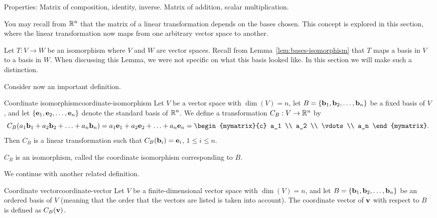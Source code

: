 Properties: Matrix of composition, identity, inverse. Matrix of
addition, scalar multiplication.



You may recall from $\mathbb{R}^n$ that the matrix of a linear transformation
depends on the bases chosen. This concept is explored in this section,
where the linear transformation now maps from one arbitrary vector
space to another.

Let $T: V \to W$ be an isomorphism where $V$ and $W$ are vector
spaces. Recall from Lemma~\ref{lem:bases-isomorphism} that $T$ maps a
basis in $V$ to a basis in $W$. When discussing this Lemma, we were
not specific on what this basis looked like. In this section we will
make such a distinction.

Consider now an important definition.

\begin{definition}{Coordinate isomorphism}{coordinate-isomorphism}
  Let $V$ be a vector space with $\dim(V)=n$, let
  $B=\left\{\mbox{\bf b}_1, \mbox{\bf b}_2, \ldots, \mbox{\bf b}_n\right\}$ be a fixed
  basis of $V$, and let
  $\left\{\mbox{\bf e}_1, \mbox{\bf e}_2, \ldots, \mbox{\bf e}_n\right\}$ denote the
  standard basis of $\mathbb{R}^n$.  We define a transformation $C_B:V\to\mathbb{R}^n$
  by
  \begin{equation*}
    C_B(a_1\vect{b}_1 + a_2\vect{b}_2 + \ldots + a_n\vect{b}_n)
    =
    a_1\vect{e}_1 + a_2\vect{e}_2 + \ldots + a_n\vect{e}_n
    =
    \begin{mymatrix}{c} a_1 \\ a_2 \\ \vdots \\ a_n
    \end{mymatrix}.
  \end{equation*}
  Then $C_B$ is a linear transformation
  such that
  $C_B(\mbox{\bf b}_i)=\mbox{\bf e}_i$, $1\leq i\leq n$.

  $C_B$ is an isomorphism, called
  the coordinate isomorphism corresponding to $B$.
\end{definition}

We continue with another related definition.

\begin{definition}{Coordinate vector}{coordinate-vector}
  Let $V$ be a finite-dimensional vector space with $\dim(V)=n$, and
  let $B=\left\{\mbox{\bf b}_1, \mbox{\bf b}_2, \ldots, \mbox{\bf b}_n\right\}$ be an
  ordered basis of $V$ (meaning that the order that the vectors are
  listed is taken into account).  The coordinate vector of $\mbox{\bf v}$
  with respect to $B$ is defined as $C_B(\mbox{\bf v})$.
\end{definition}

